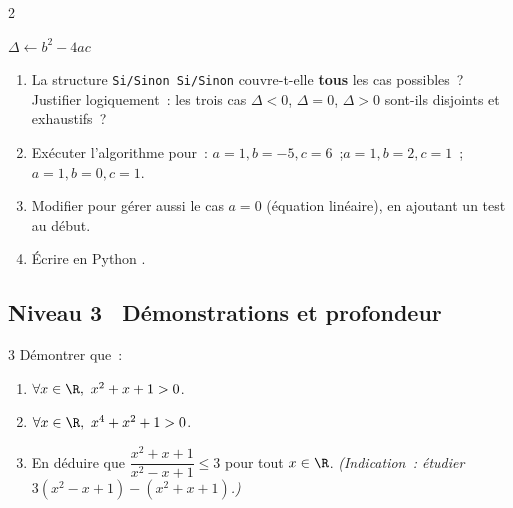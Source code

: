 \begin{exo}[\logicoalgo\ Algorithme~: r\'esoudre $ax^2+bx+c=0$ \corrige]{2}

\begin{algorithm}[H]
\caption{R\'esolution de l'\'equation du second degr\'e}
$\Delta \leftarrow b^2 - 4ac$\;
\end{algorithm}

\begin{enumerate}
  \item La structure \texttt{Si/Sinon Si/Sinon} couvre-t-elle \textbf{tous}
        les cas possibles~? Justifier logiquement~: les trois cas
        $\Delta<0$, $\Delta=0$, $\Delta>0$ sont-ils disjoints et exhaustifs~?
  \item Ex\'ecuter l'algorithme pour~:
        $a=1, b=-5, c=6$~;\quad $a=1, b=2, c=1$~;\quad $a=1, b=0, c=1$.
  \item Modifier pour g\'erer aussi le cas $a=0$
        (\'equation lin\'eaire), en ajoutant un test au d\'ebut.
  \item \'Ecrire en Python \computer.
\end{enumerate}
\end{exo}

\subsection*{\quad Niveau 3 \textemdash\ D\'emonstrations et profondeur}

\begin{exo}{3}
D\'emontrer que~:
\begin{enumerate}
  \item $\forall x \in \R,\ x^2 + x + 1 > 0$.
  \item $\forall x \in \R,\ x^4 + x^2 + 1 > 0$.
  \item En d\'eduire que $\dfrac{x^2+x+1}{x^2-x+1} \leq 3$ pour tout $x\in\R$.
        \emph{(Indication~: \'etudier $3(x^2-x+1)-(x^2+x+1)$.)}
\end{enumerate}
\end{exo}

